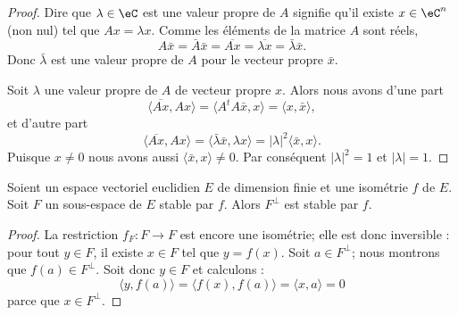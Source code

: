 \begin{proof}
	Dire que \( \lambda\in \eC\) est une valeur propre de \( A\) signifie qu'il existe \( x\in \eC^n\) (non nul) tel que \( Ax=\lambda x\). Comme les éléments de la matrice \( A\) sont réels,
	\begin{equation}
		A\bar x=\bar A\bar x=\overline{ Ax }=\overline{ \lambda x }=\bar \lambda\bar x.
	\end{equation}
	Donc \( \bar \lambda\) est une valeur propre de \( A\) pour le vecteur propre \( \bar x\).

	Soit \( \lambda\)  une valeur propre de \( A\) de vecteur propre \( x\). Alors nous avons d'une part
	\begin{equation}
		\langle \overline{ Ax }, Ax\rangle =\langle A^tA\bar x, x\rangle =\langle x, \bar x\rangle ,
	\end{equation}
	et d'autre part
	\begin{equation}
		\langle \overline{ Ax }, Ax\rangle =\langle \bar \lambda \bar x, \lambda x\rangle =| \lambda |^2\langle \bar x, x\rangle .
	\end{equation}
	Puisque \( x\neq 0\) nous avons aussi \( \langle \bar x, x\rangle \neq 0\). Par conséquent \( | \lambda |^2=1\) et \( | \lambda |=1\).
\end{proof}

\begin{lemma}        \label{LEMooNEDQooNRmASH}
	Soient un espace vectoriel euclidien \( E\) de dimension finie et une isométrie \( f\) de \( E\). Soit \( F\) un sous-espace de \( E\) stable par \( f\). Alors \( F^{\perp}\) est stable par \( f\).
\end{lemma}

\begin{proof}
	La restriction \( f_F\colon F\to F\) est encore une isométrie; elle est donc inversible : pour tout \( y\in F\), il existe \( x\in F\) tel que \( y=f(x)\). Soit \( a\in F^{\perp}\); nous montrons que \( f(a)\in F^{\perp}\). Soit donc \( y\in F\) et calculons :
	\begin{equation}
		\langle y, f(a)\rangle =\langle f(x), f(a)\rangle =\langle x,a \rangle =0
	\end{equation}
	parce que \( x\in F^{\perp}\).
\end{proof}

